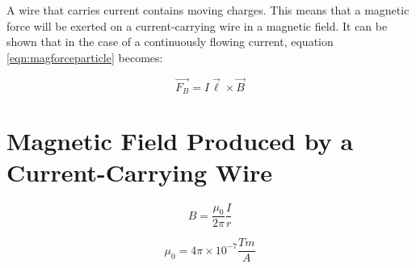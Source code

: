 	A wire that carries current contains moving charges.  This means that a magnetic force  will be exerted on a current-carrying wire in a magnetic field.  It can be shown that in the case of a continuously flowing current, equation \ref{eqn:magforceparticle} becomes:
	
		\begin{mdframed}[backgroundcolor=orange!20!white]
		\begin{equation}
			\overrightarrow{F_B} = I \vec{\ell} \times \vec{B}
			\label{eqn:magforcewire}
		\end{equation}
	\end{mdframed}

	
	\section{Magnetic Field Produced by a Current-Carrying Wire}
	
		\begin{mdframed}[backgroundcolor=orange!20!white]
		\begin{equation}
			B = \frac{\mu_0}{2\pi}\frac{I}{r}
			\label{eqn:magfieldwire}
		\end{equation}
	\end{mdframed}
	
	\begin{mdframed}[backgroundcolor=green!20!white]
	\begin{equation*}
		\mu_0 = 4\pi \times 10^{-7} \si{\frac{T m}{A}}
		\label{constant:permeabilityoffreespace}
	\end{equation*}
\end{mdframed}	
		
	
	
	

	


